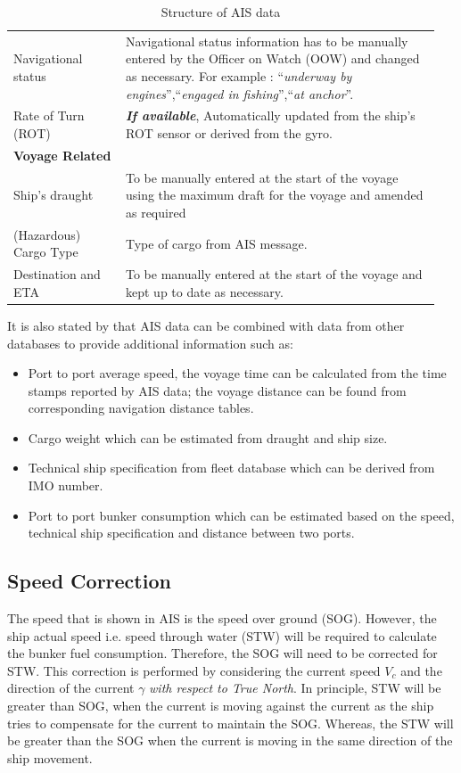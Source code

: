 \begin{table}
{\begin{tabular}{ p{0.25\linewidth} p{0.7\linewidth}  }
    Navigational status & Navigational status information has to be manually entered by the Officer on Watch (OOW) and changed as necessary. For example : ``\emph{underway by engines}'',``\emph{engaged in fishing}'',``\emph{at anchor}''.\\
    Rate of Turn (ROT) & \emph{\textbf{If available}}, Automatically updated from the ship's ROT sensor or derived from
    the gyro.\\
    \hline
    \multicolumn{2}{l}{\textbf{Voyage Related}}\\
    \hline
    Ship's draught & To be manually entered at the start of the voyage using the
    maximum draft for the voyage and amended as required \\
    (Hazardous) Cargo Type & Type of cargo from AIS message.\\
    Destination and ETA & To be manually entered at the start of the voyage and kept up to
    date as necessary.\\
    \hline
    \end{tabular}}
\caption{Structure of AIS data }\label{tbl:AIS_struct}
\end{table}

It is also stated by  that AIS data can be combined with data from other databases to provide additional information such as:\\

\begin{itemize}
    \setlength\itemsep{0em}
    \item Port to port average speed, the voyage time can be calculated from the time stamps reported by AIS data; the voyage distance can be found from corresponding navigation distance tables.
    \item Cargo weight which can be estimated from draught and ship size.
    \item Technical ship specification from fleet database which can be derived from IMO number.
    \item Port to port bunker consumption which can be estimated based on the speed, technical ship specification and distance between two ports.
\end{itemize}

\subsection{Speed Correction}\label{sec:SOG_corr}

The speed that is shown in AIS is the speed over ground (SOG). However, the ship actual speed i.e. speed through water (STW) will be required to calculate the bunker fuel consumption. Therefore, the SOG will need to be corrected for STW. This correction is performed by considering the current speed $V_c$ and the direction of the current $\gamma$ \emph{with respect to True North}. In principle, STW will be greater than SOG, when the current is moving against the current as the ship tries to compensate for the current to maintain the SOG. Whereas, the STW will be greater than the SOG when the current is moving in the same direction of the ship movement. \\

